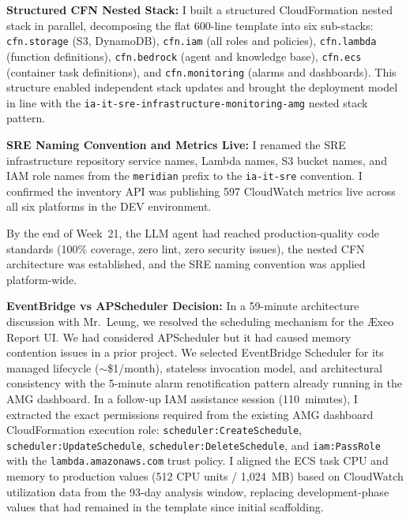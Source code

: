 \textbf{Structured CFN Nested Stack:} 
I built a structured CloudFormation
nested stack in parallel, decomposing the flat 600-line template into six
sub-stacks: \texttt{cfn.storage} (S3, DynamoDB), \texttt{cfn.iam} (all
roles and policies), \texttt{cfn.lambda} (function definitions), \texttt{cfn.bedrock}
(agent and knowledge base), \texttt{cfn.ecs} (container task definitions),
and \texttt{cfn.monitoring} (alarms and dashboards). This structure enabled
independent stack updates and brought the deployment model in line with
the \texttt{ia-it-sre-infrastructure-monitoring-amg} nested stack pattern.

\textbf{SRE Naming Convention and Metrics Live:} 
I renamed the SRE
infrastructure repository service names, Lambda names, S3 bucket names,
and IAM role names from the \texttt{meridian} prefix to the
\texttt{ia-it-sre} convention. I confirmed the inventory API was publishing
597 CloudWatch metrics live across all six platforms in the DEV environment.

By the end of Week~21, the LLM agent had reached production-quality
code standards (100\% coverage, zero lint, zero security issues), the
nested CFN architecture was established, and the SRE naming convention
was applied platform-wide.

\textbf{EventBridge vs APScheduler Decision:} 
In a 59-minute architecture
discussion with Mr.\ Leung, we resolved the scheduling mechanism for
the \AE xeo Report UI. We had considered APScheduler but it had caused memory
contention issues in a prior project. We selected EventBridge Scheduler
for its managed lifecycle ($\sim$\$1/month), stateless invocation model,
and architectural consistency with the 5-minute alarm renotification pattern
already running in the AMG dashboard. In a follow-up IAM assistance session (110~minutes),
I extracted the exact permissions required from the existing
AMG dashboard CloudFormation execution role:
\texttt{scheduler:CreateSchedule}, \texttt{scheduler:UpdateSchedule},
\texttt{scheduler:DeleteSchedule}, and \texttt{iam:PassRole} with the
\texttt{lambda.amazonaws.com} trust policy. I aligned the ECS task CPU and memory
to production values (512 CPU units / 1,024~MB) based on
CloudWatch utilization data from the 93-day analysis window, replacing development-phase values that had remained in the template
since initial scaffolding.



